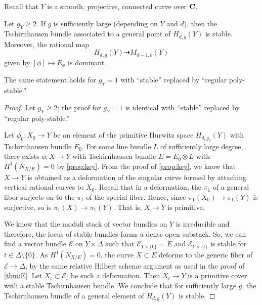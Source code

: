 \documentclass[11 pt]{amsart}
\providecommand {\C}{{\bf C}}
\providecommand {\from}{{\colon}}
\numberwithin{equation}{section}
\begin{document}
Recall that $Y$ is a smooth, projective, connected curve over $\C$.
\begin{theorem}
  \label{thm:stability}
  Let $g_Y \geq 2$.
  If $g$ is sufficiently large (depending on $Y$ and $d$), then the Tschirnhausen bundle associated to a general point of $H_{d,g}(Y)$ is stable.
  Moreover, the rational map
  \[H_{d,g}(Y) \dashrightarrow M_{d-1,b}(Y)\]
  given by $[\phi] \mapsto E_\phi$ is dominant.

  The same statement holds for $g_Y = 1$ with ``stable'' replaced by ``regular poly-stable.''
\end{theorem}
\begin{proof}
  Let $g_Y \geq 2$; the proof for $g_Y = 1$ is identical with ``stable'' replaced by ``regular poly-stable.''

  Let $\phi_0 \from X_0 \to Y$ be an element of the primitive Hurwitz space $H_{d,g_0}(Y)$ with Tschirnhausen bundle $E_0$.
  For some line bundle $L$ of sufficiently large degree, there exists $\phi \from X \to Y$ with Tschirnhausen bundle $E = E_0 \otimes L$ with $H^1(N_{X/E}) = 0$ by \autoref{prop:key}.
  From the proof of \autoref{prop:key}, we know that $X \to Y$ is obtained as a deformation of the singular curve formed by attaching vertical rational curves to $X_0$.
  Recall that in a deformation, the $\pi_1$ of a general fiber surjects on to the $\pi_1$ of the special fiber.
  Hence, since $\pi_1(X_0) \to \pi_1(Y)$ is surjective, so is $\pi_1(X) \to \pi_1(Y)$.
  That is, $X \to Y$ is primitive.

  We know that the moduli stack of vector bundles on $Y$ is irreducible \cite[Appendix~A]{hof:10} and therefore, the locus of stable bundles forms a dense open substack.
  So, we can find a vector bundle $\mathcal E$ on $Y \times \Delta$ such that $\mathcal E_{Y \times \{0\}} = E$ and $\mathcal E_{Y \times \{t\}}$ is stable for $t \in \Delta \setminus \{0\}$.
  As $H^1(N_{X/E}) = 0$, the curve $X \subset E$ deforms to the generic fiber of $\mathcal E \to \Delta$, by the same relative Hilbert scheme argument as used in the proof of \autoref{thm:E}.
  Let $X_t \subset \mathcal E_t$ be such a deformation.
  Then $X_t \to Y$ is a primitive cover with a stable Tschirnhausen bundle.
  We conclude that for sufficiently large $g$, the Tschirnhausen bundle of a general element of $H_{d,g}(Y)$ is stable.


\end{proof}
\end{document}
